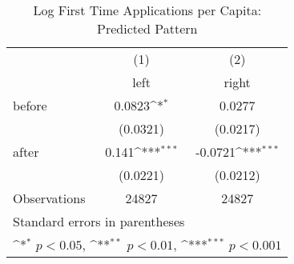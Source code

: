 \begin{table}[htbp]\centering
\def\sym#1{\ifmmode^{#1}\else\(^{#1}\)\fi}
\caption{Log First Time Applications per Capita: Predicted Pattern}
\begin{tabular}{l*{2}{c}}
\hline\hline
                    &\multicolumn{1}{c}{(1)}&\multicolumn{1}{c}{(2)}\\
                    &\multicolumn{1}{c}{left}&\multicolumn{1}{c}{right}\\
\hline
before              &      0.0823\sym{*}  &      0.0277         \\
                    &    (0.0321)         &    (0.0217)         \\
[1em]
after               &       0.141\sym{***}&     -0.0721\sym{***}\\
                    &    (0.0221)         &    (0.0212)         \\
\hline
Observations        &       24827         &       24827         \\
\hline\hline
\multicolumn{3}{l}{\footnotesize Standard errors in parentheses}\\
\multicolumn{3}{l}{\footnotesize \sym{*} \(p<0.05\), \sym{**} \(p<0.01\), \sym{***} \(p<0.001\)}\\
\end{tabular}
\end{table}
